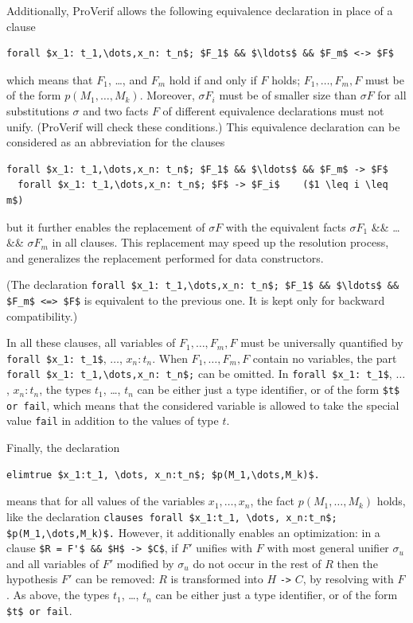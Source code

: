 \documentclass{book}
\begin{document}
Additionally, ProVerif allows the following equivalence declaration in place of a clause
\begin{lstlisting}[numbers=none]
  forall $x_1: t_1,\dots,x_n: t_n$; $F_1$ && $\ldots$ && $F_m$ <-> $F$
\end{lstlisting}
which means that $F_1$, \ldots, and $F_m$ hold if and only if $F$
holds; $F_1, \ldots, F_m, F$ must be of the form $p(M_1, \ldots,
M_k)$. Moreover, $\sigma F_i$ must be of smaller size than $\sigma F$ for all substitutions $\sigma$
and two facts $F$ of different equivalence declarations must not unify.
(ProVerif will check these conditions.)
This equivalence declaration can be considered as an abbreviation for the clauses
\begin{lstlisting}[numbers=none]
  forall $x_1: t_1,\dots,x_n: t_n$; $F_1$ && $\ldots$ && $F_m$ -> $F$
  forall $x_1: t_1,\dots,x_n: t_n$; $F$ -> $F_i$    ($1 \leq i \leq m$)
\end{lstlisting}
but it further enables the replacement of $\sigma F$ with
the equivalent facts $\sigma F_1$ \&\& \dots \&\& $\sigma F_m$
in all clauses. This replacement may speed up the resolution process,
and generalizes the replacement performed for data constructors.

(The declaration
\lstinline!forall $x_1: t_1,\dots,x_n: t_n$; $F_1$ && $\ldots$ && $F_m$ <=> $F$!
is equivalent to the previous one. It is kept only for backward compatibility.)

In all these clauses, all variables of $F_1, \ldots, F_m, F$ must
be universally quantified by \lstinline!forall $x_1: t_1$!, $\dots$,
$x_n: t_n$.  When $F_1, \ldots, F_m, F$ contain no variables, the part
\lstinline!forall $x_1: t_1,\dots,x_n: t_n$;!  can be omitted.
In \lstinline!forall $x_1: t_1$!, $\dots$, $x_n: t_n$, the types $t_1$, \ldots, $t_n$
can be either just a type identifier, or of the form \lstinline!$t$ or fail!,
which means that the considered variable is allowed to take the special
value \lstinline!fail! in addition to the values of type $t$.

Finally, the declaration
%
\begin{lstlisting}[numbers=none]
	elimtrue $x_1:t_1, \dots, x_n:t_n$; $p(M_1,\dots,M_k)$.
\end{lstlisting}
%
means that for all values of the variables $x_1,\ldots,x_n$, the fact
$p(M_1,\ldots,M_k)$ holds, like the declaration
\lstinline!clauses forall $x_1:t_1, \dots, x_n:t_n$; $p(M_1,\dots,M_k)$.!
%
However, it additionally enables an optimization: in a clause
\lstinline!$R = F'$ && $H$ -> $C$!, if $F'$ unifies with $F$ with most
general unifier $\sigma_u$ and all variables of $F'$ modified by
$\sigma_u$ do not occur in the rest of $R$ then the hypothesis $F'$
can be removed: $R$ is transformed into $H$ \lstinline{->} $C$, by
resolving with $F$.
%
As above, the types $t_1$, \ldots, $t_n$ can be either just a type
identifier, or of the form \lstinline!$t$ or fail!.
\end{document}
